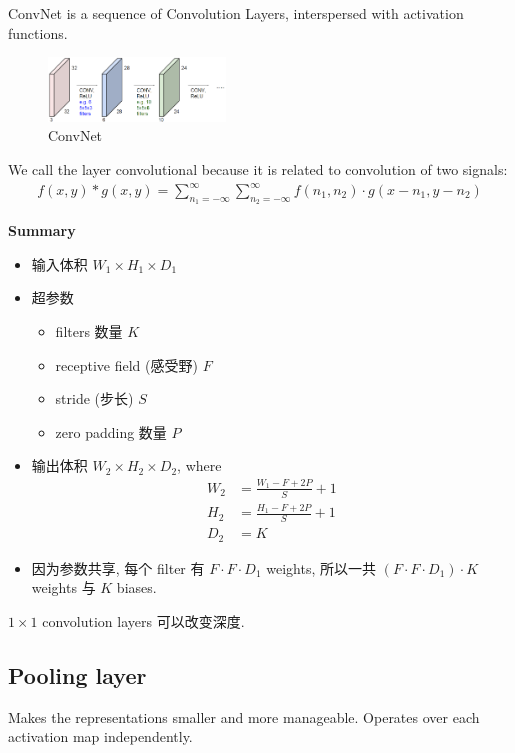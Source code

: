 ConvNet is a sequence of Convolution Layers, interspersed with activation functions. 

\begin{figure}[!htb]
    \centering
    \includegraphics[width=0.42\textwidth]{pic/Lec5/ConvNet.png}
    \caption{ConvNet}
\end{figure}

We call the layer convolutional because it is related to convolution of two signals:
\begin{align*}
    f(x,y)*g(x,y)=\sum_{n_1=-\infty}^{\infty}\sum_{n_2=-\infty}^{\infty}f(n_1, n_2)\cdot g(x-n_1, y-n_2)
\end{align*}

\textbf{Summary}
\begin{itemize}
    \item 输入体积 $W_1\times H_1 \times  D_1$
    \item 超参数
    \begin{itemize}
        \item filters 数量 $K$
        \item receptive field (感受野) $F$
        \item stride (步长) $S$
        \item zero padding 数量 $P$
    \end{itemize}
    \item 输出体积 $W_2\times H_2 \times  D_2$, where
    \begin{align*}
        W_2&=\frac{W_1 -F +2P}{S}+1\\
        H_2&=\frac{H_1 -F +2P}{S}+1\\
        D_2&=K
    \end{align*}
    \item 因为参数共享, 每个 filter 有 $F\cdot F\cdot D_1$ weights, 所以一共 $(F\cdot F\cdot D_1)\cdot K$ weights 与 $K$ biases. 
\end{itemize}

$1\times 1$ convolution layers 可以改变深度. 

\subsection{Pooling layer}
Makes the representations smaller and more manageable. Operates over each activation map independently. 


